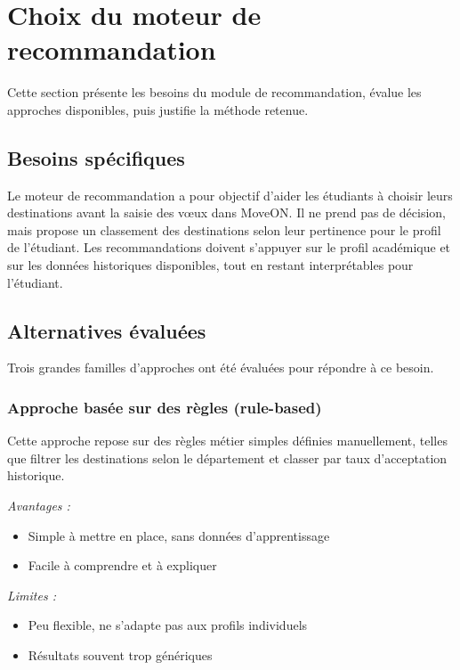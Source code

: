\section{Choix du moteur de recommandation}

Cette section présente les besoins du module de recommandation,
évalue les approches disponibles, puis justifie la méthode retenue.

\subsection{Besoins spécifiques}

Le moteur de recommandation a pour objectif d'aider les étudiants à
choisir leurs destinations avant la saisie des vœux dans MoveON. Il
ne prend pas de décision, mais propose un classement des destinations
selon leur pertinence pour le profil de l'étudiant. Les recommandations
doivent s'appuyer sur le profil académique et sur les données historiques
disponibles, tout en restant interprétables pour l'étudiant.

\subsection{Alternatives évaluées}

Trois grandes familles d'approches ont été évaluées pour répondre à
ce besoin.

\subsubsection{Approche basée sur des règles (rule-based)}

Cette approche repose sur des règles métier simples définies manuellement,
telles que filtrer les destinations selon le département et classer par
taux d'acceptation historique.

\textit{Avantages :}
\begin{itemize}
  \item Simple à mettre en place, sans données d'apprentissage
  \item Facile à comprendre et à expliquer
\end{itemize}

\textit{Limites :}
\begin{itemize}
  \item Peu flexible, ne s'adapte pas aux profils individuels
  \item Résultats souvent trop génériques
\end{itemize}

